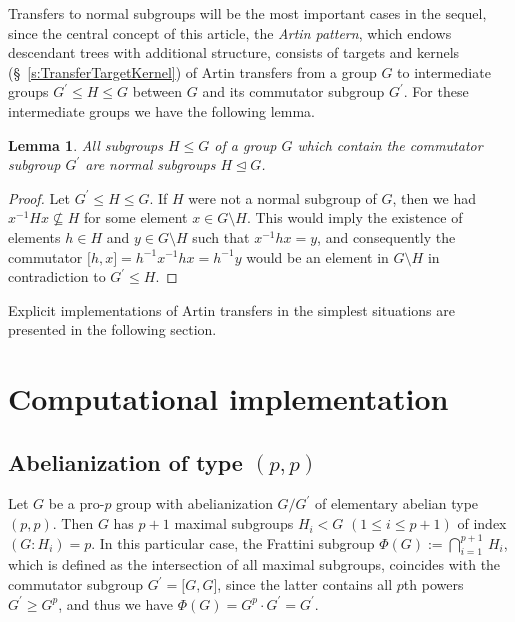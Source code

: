 \documentclass{amsart}
\newtheorem{lemma}{Lemma}[section]
\theoremstyle{definition}
\numberwithin{equation}{section}
\begin{document}
Transfers to normal subgroups will be the most important cases in the sequel,
since the central concept of this article, the \textit{Artin pattern},
which endows descendant trees with additional structure,
consists of targets and kernels (\S\
\ref{s:TransferTargetKernel})
of Artin transfers from a group \(G\) to intermediate groups \(G^\prime\le H\le G\)
between \(G\) and its commutator subgroup \(G^\prime\).
For these intermediate groups we have the following lemma.

\begin{lemma}
\label{lem:HeadSbg}
All subgroups \(H\le G\) of a group \(G\) which contain the commutator subgroup \(G^\prime\)
are normal subgroups \(H\unlhd G\).
\end{lemma}

\begin{proof}
Let \(G^\prime\le H\le G\).
If \(H\) were not a normal subgroup of \(G\),
then we had \(x^{-1}Hx\not\subseteq H\) for some element \(x\in G\setminus H\).
This would imply the existence of elements \(h\in H\) and \(y\in G\setminus H\)
such that \(x^{-1}hx=y\), and consequently the commutator
\(\lbrack h,x\rbrack=h^{-1}x^{-1}hx=h^{-1}y\) would be an element in \(G\setminus H\)
in contradiction to \(G^\prime\le H\).
\end{proof}


Explicit implementations of Artin transfers in the simplest situations are presented in the following section.



\normalsize

\section{Computational implementation}
\label{s:CompImpl}

\subsection{Abelianization of type \((p,p)\)}
\label{ss:TypePePe}

Let \(G\) be a pro-\(p\) group with abelianization \(G/G^\prime\) of elementary abelian type \((p,p)\).
Then \(G\) has \(p+1\) maximal subgroups \(H_i<G\) \((1\le i\le p+1)\) of index \((G:H_i)=p\).
In this particular case,
the Frattini subgroup \(\Phi(G):=\bigcap_{i=1}^{p+1}\,H_i\),
which is defined as the intersection of all maximal subgroups,
coincides with the commutator subgroup \(G^\prime=\lbrack G,G\rbrack\),
since the latter contains all \(p\)th powers \(G^\prime\ge G^p\),
and thus we have \(\Phi(G)=G^p\cdot G^\prime=G^\prime\).
\end{document}
